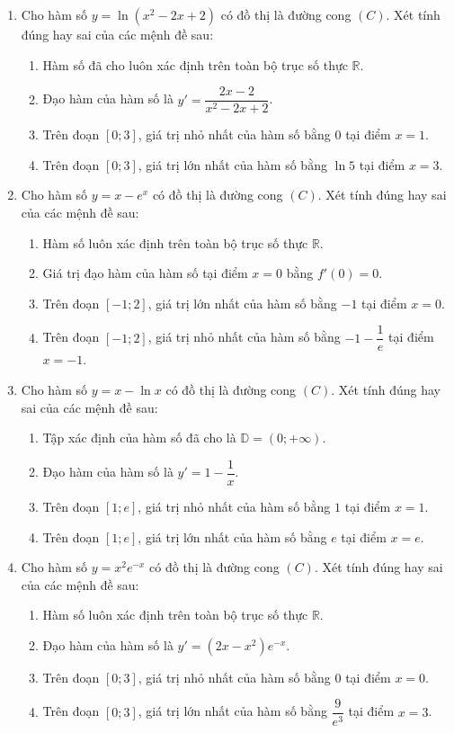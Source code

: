 \documentclass[12pt]{article}
\begin{document}
\begin{enumerate}[label=\textbf{Câu \arabic*.}]
		\item Cho hàm số $y = \ln(x^2 - 2x + 2)$ có đồ thị là đường cong $(C)$. Xét tính đúng hay sai của các mệnh đề sau:
		\begin{enumerate}[label=\alph*)]
			\item Hàm số đã cho luôn xác định trên toàn bộ trục số thực $\mathbb{R}$.
			\item Đạo hàm của hàm số là $y' = \dfrac{2x - 2}{x^2 - 2x + 2}$.
			\item Trên đoạn $[0; 3]$, giá trị nhỏ nhất của hàm số bằng $0$ tại điểm $x = 1$.
			\item Trên đoạn $[0; 3]$, giá trị lớn nhất của hàm số bằng $\ln 5$ tại điểm $x = 3$.
		\end{enumerate}
		
		\item Cho hàm số $y = x - e^x$ có đồ thị là đường cong $(C)$. Xét tính đúng hay sai của các mệnh đề sau:
		\begin{enumerate}[label=\alph*)]
			\item Hàm số luôn xác định trên toàn bộ trục số thực $\mathbb{R}$.
			\item Giá trị đạo hàm của hàm số tại điểm $x = 0$ bằng $f'(0) = 0$.
			\item Trên đoạn $[-1; 2]$, giá trị lớn nhất của hàm số bằng $-1$ tại điểm $x = 0$.
			\item Trên đoạn $[-1; 2]$, giá trị nhỏ nhất của hàm số bằng $-1 - \dfrac{1}{e}$ tại điểm $x = -1$.
		\end{enumerate}
		
		\item Cho hàm số $y = x - \ln x$ có đồ thị là đường cong $(C)$. Xét tính đúng hay sai của các mệnh đề sau:
		\begin{enumerate}[label=\alph*)]
			\item Tập xác định của hàm số đã cho là $\mathbb{D} = (0; +\infty)$.
			\item Đạo hàm của hàm số là $y' = 1 - \dfrac{1}{x}$.
			\item Trên đoạn $[1; e]$, giá trị nhỏ nhất của hàm số bằng $1$ tại điểm $x = 1$.
			\item Trên đoạn $[1; e]$, giá trị lớn nhất của hàm số bằng $e$ tại điểm $x = e$.
		\end{enumerate}
		
		\item Cho hàm số $y = x^2 e^{-x}$ có đồ thị là đường cong $(C)$. Xét tính đúng hay sai của các mệnh đề sau:
		\begin{enumerate}[label=\alph*)]
			\item Hàm số luôn xác định trên toàn bộ trục số thực $\mathbb{R}$.
			\item Đạo hàm của hàm số là $y' = (2x - x^2)e^{-x}$.
			\item Trên đoạn $[0; 3]$, giá trị nhỏ nhất của hàm số bằng $0$ tại điểm $x = 0$.
			\item Trên đoạn $[0; 3]$, giá trị lớn nhất của hàm số bằng $\dfrac{9}{e^3}$ tại điểm $x = 3$.
		\end{enumerate}
		
	\end{enumerate}
	
\end{document}
